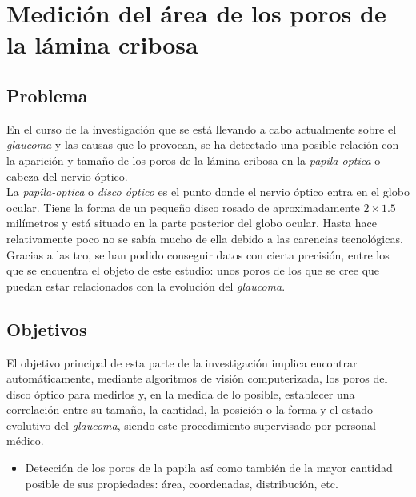 \chapter{Medición del área de los poros de la lámina cribosa}
\section{Problema}
En el curso de la investigación que se está llevando a cabo
actualmente sobre el \emph{\gls{glaucoma}} y las causas que lo
provocan, se ha detectado una posible relación con la aparición y
tamaño de los poros de la lámina cribosa en la
\emph{\gls{papila-optica}} o cabeza del nervio óptico. \\
La \emph{\gls{papila-optica}} o \emph{disco óptico} es el punto donde
el nervio óptico entra en el globo ocular. Tiene la forma de un
pequeño disco rosado de aproximadamente $2 \times 1.5$ milímetros y
está situado en la parte posterior del globo ocular. Hasta hace
relativamente poco no se sabía mucho de ella debido a las carencias
tecnológicas. Gracias a las \gls{tco}, se han podido conseguir datos
con cierta precisión, entre los que se encuentra el objeto de este
estudio: unos poros de los que se cree que puedan estar
relacionados con la evolución del \emph{\gls{glaucoma}}.

\section{Objetivos}
El objetivo principal de esta parte de la investigación implica
encontrar automáticamente, mediante algoritmos de visión
computerizada, los poros del disco óptico para medirlos y, en la
medida de lo posible, establecer una correlación entre su tamaño, la
cantidad, la posición o la forma y el estado evolutivo del
\emph{\gls{glaucoma}}, siendo este procedimiento supervisado por
personal médico.
\begin{itemize}
\item Detección de los poros de la papila así como también de la mayor
  cantidad posible de sus propiedades: área, coordenadas,
  distribución, etc.
\end{itemize}


